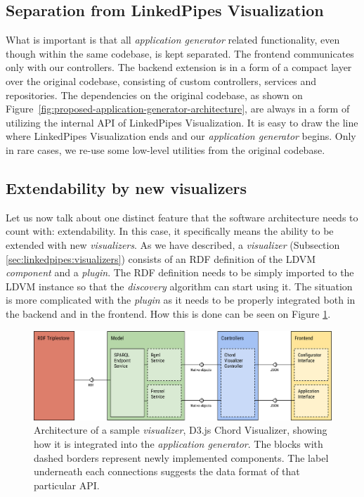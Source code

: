 \subsection{Separation from LinkedPipes Visualization}

What is important is that all \emph{application generator} related functionality, even though within the same codebase, is kept separated. The frontend communicates only with our controllers. The backend extension is in a form of a compact layer over the original codebase, consisting of custom controllers, services and repositories. The dependencies on the original codebase, as shown on Figure~\ref{fig:proposed-application-generator-architecture}, are always in a form of utilizing the internal API of LinkedPipes Visualization. It is easy to draw the line where LinkedPipes Visualization ends and our \emph{application generator} begins. Only in rare cases, we re-use some low-level utilities from the original codebase.

\subsection{Extendability by new visualizers}

Let us now talk about one distinct feature that the software architecture needs to count with: extendability. In this case, it specifically means the ability to be extended with new \emph{visualizers}. As we have described, a \emph{visualizer} (Subsection \ref{sec:linkedpipes:visualizers}) consists of an RDF definition of the LDVM \emph{component} and a \emph{plugin}. The RDF definition needs to be simply imported to the LDVM instance so that the \emph{discovery} algorithm can start using it. The situation is more complicated with the \emph{plugin} as it needs to be properly integrated both in the backend and in the frontend. How this is done can be seen on Figure \ref{fig:sample-visualizer-structure}.

\begin{figure}
	\centering
	\includegraphics[width=140mm]{img/04_chord_visualizer_structure.png}
	\caption{Architecture of a sample \emph{visualizer}, D3.js Chord Visualizer, showing how it is integrated into the \emph{application generator}. The blocks with dashed borders represent newly implemented components. The label underneath each connections suggests the data format of that particular API.} 
	\label{fig:sample-visualizer-structure}
\end{figure}

